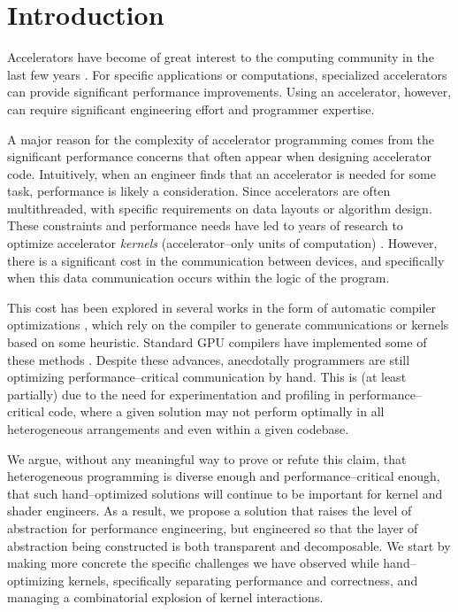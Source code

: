 \section{Introduction}
\label{sec:caimanintro}

Accelerators have become of great interest to the computing community in the last few years .  For specific applications or computations, specialized accelerators can provide significant performance improvements.  Using an accelerator, however, can require significant engineering effort and programmer expertise.

A major reason for the complexity of accelerator programming comes from the significant performance concerns that often appear when designing accelerator code.  Intuitively, when an engineer finds that an accelerator is needed for some task, performance is likely a consideration.  Since accelerators are often multithreaded, with specific requirements on data layouts or algorithm design.  These constraints and performance needs have led to years of research to optimize accelerator \emph{kernels} (accelerator--only units of computation) .  However, there is a significant cost in the communication between devices, and specifically when this data communication occurs within the logic of the program.

This cost has been explored in several works in the form of automatic compiler optimizations , which rely on the compiler to generate communications or kernels based on some heuristic.  Standard GPU compilers have implemented some of these methods .  Despite these advances, anecdotally programmers are still optimizing performance--critical communication by hand.  This is (at least partially) due to the need for experimentation and profiling in performance--critical code, where a given solution may not perform optimally in all heterogeneous arrangements and even within a given codebase.

We argue, without any meaningful way to prove or refute this claim, that heterogeneous programming is diverse enough and performance--critical enough, that such hand--optimized solutions will continue to be important for kernel and shader engineers.  As a result, we propose a solution that raises the level of abstraction for performance engineering, but engineered so that the layer of abstraction being constructed is both transparent and decomposable.  We start by making more concrete the specific challenges we have observed while hand--optimizing kernels, specifically separating performance and correctness, and managing a combinatorial explosion of kernel interactions.


